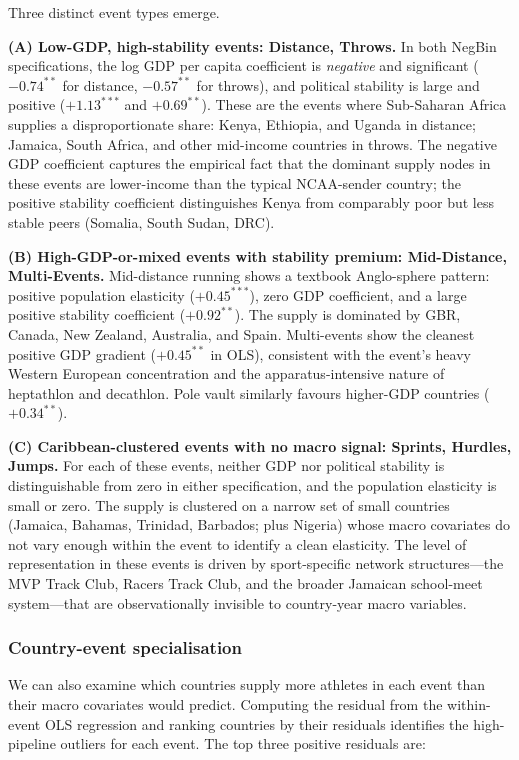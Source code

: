 \documentclass[11pt]{article}
\begin{document}
Three distinct event types emerge.

\textbf{(A) Low-GDP, high-stability events: Distance, Throws.}\quad
In both NegBin specifications, the log GDP per capita coefficient is
\emph{negative} and significant ($-0.74^{**}$ for distance,
$-0.57^{**}$ for throws), and political stability is large and
positive ($+1.13^{***}$ and $+0.69^{**}$). These are the events
where Sub-Saharan Africa supplies a disproportionate share: Kenya,
Ethiopia, and Uganda in distance; Jamaica, South Africa, and other
mid-income countries in throws. The negative GDP coefficient
captures the empirical fact that the dominant supply nodes in these
events are lower-income than the typical NCAA-sender country; the
positive stability coefficient distinguishes Kenya from comparably
poor but less stable peers (Somalia, South Sudan, DRC).

\textbf{(B) High-GDP-or-mixed events with stability premium:
Mid-Distance, Multi-Events.}\quad
Mid-distance running shows a textbook Anglo-sphere pattern: positive
population elasticity ($+0.45^{***}$), zero GDP coefficient, and a
large positive stability coefficient ($+0.92^{**}$). The supply is
dominated by GBR, Canada, New Zealand, Australia, and Spain.
Multi-events show the cleanest positive GDP gradient
($+0.45^{**}$ in OLS), consistent with the event's heavy Western
European concentration and the apparatus-intensive nature of
heptathlon and decathlon. Pole vault similarly favours higher-GDP
countries ($+0.34^{**}$).

\textbf{(C) Caribbean-clustered events with no macro signal:
Sprints, Hurdles, Jumps.}\quad
For each of these events, neither GDP nor political stability is
distinguishable from zero in either specification, and the
population elasticity is small or zero. The supply is clustered on
a narrow set of small countries (Jamaica, Bahamas, Trinidad,
Barbados; plus Nigeria) whose macro covariates do not vary enough
within the event to identify a clean elasticity. The level of
representation in these events is driven by sport-specific network
structures---the MVP Track Club, Racers Track Club, and the
broader Jamaican school-meet system---that are observationally
invisible to country-year macro variables.

\subsubsection*{Country-event specialisation}

We can also examine which countries supply more athletes in each
event than their macro covariates would predict. Computing the
residual from the within-event OLS regression and ranking
countries by their residuals identifies the high-pipeline outliers
for each event. The top three positive residuals are:
\end{document}
